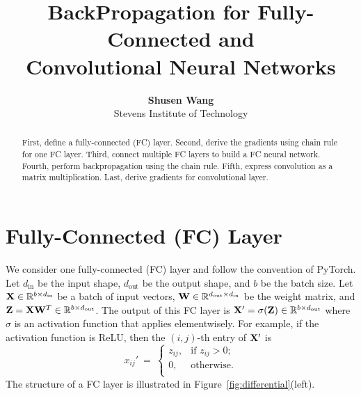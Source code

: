 \documentclass[11pt]{article}
\numberwithin{equation}{section}
\def\W{{\bf W}}
\def\X{{\bf X}}
\def\Z{{\bf Z}}
\def\RB{{\mathbb R}}
\def\din{{d_{\textrm{in}}}}
\def\dout{{d_{\textrm{out}}}}
\begin{document}


\title{BackPropagation for Fully-Connected and \\Convolutional Neural Networks}

\author{\textbf{Shusen Wang} \\ Stevens Institute of Technology}


\maketitle

\begin{abstract}
First, define a fully-connected (FC) layer.
Second, derive the gradients using chain rule for one FC layer.
Third, connect multiple FC layers to build a FC neural network.
Fourth, perform backpropagation using the chain rule.
Fifth, express convolution as a matrix multiplication.
Last, derive gradients for convolutional layer.
\end{abstract}


\section{Fully-Connected (FC) Layer}



We consider one fully-connected (FC) layer and follow the convention of PyTorch.
Let $\din$ be the input shape, $\dout$ be the output shape, and $b$ be the batch size.
Let $\X \in \RB^{b\times \din}$ be a batch of input vectors, $\W \in \RB^{\dout \times \din}$ be the weight matrix, and $\Z = \X \W^T \in \RB^{b\times \dout}$.
The output of this FC layer is $\X' = \sigma (\Z) \in \RB^{b\times \dout}$ where $\sigma$ is an activation function that applies elementwisely.
For example, if the activation function is ReLU, then the $(i,j)$-th entry of $\X'$ is
\begin{equation*}
    x_{ij}'
    \: = \:
    \left\{
    \begin{array}{cc}
         z_{ij}, & \textrm{if } z_{ij} > 0;  \\
         0, & \textrm{otherwise.} \\
    \end{array}
    \right.
\end{equation*}
The structure of a FC layer is illustrated in Figure~\ref{fig:differential}(left).
\end{document}
